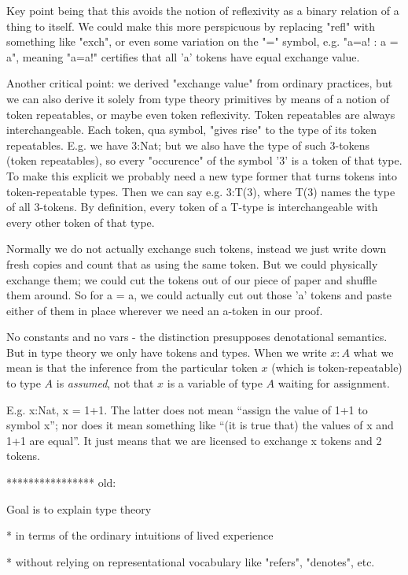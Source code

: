 \documentclass{article}
\begin{document}
Key point being that this avoids the notion of reflexivity as a binary
relation of a thing to itself.  We could make this more perspicuous by
replacing "refl" with something like "exch", or even some variation on
the "=" symbol, e.g.  "a=a! : a = a", meaning "a=a!" certifies that
all 'a' tokens have equal exchange value.

Another critical point: we derived "exchange value" from ordinary
practices, but we can also derive it solely from type theory
primitives by means of a notion of token repeatables, or maybe even
token reflexivity.  Token repeatables are always interchangeable.
Each token, qua symbol, "gives rise" to the type of its token
repeatables.  E.g. we have 3:Nat; but we also have the type of such
3-tokens (token repeatables), so every "occurence" of the symbol '3'
is a token of that type.  To make this explicit we probably need a new
type former that turns tokens into token-repeatable types.  Then we
can say e.g. 3:T(3), where T(3) names the type of all 3-tokens.  By
definition, every token of a T-type is interchangeable with every
other token of that type.

Normally we do not actually exchange such tokens, instead we just
write down fresh copies and count that as using the same token.  But
we could physically exchange them; we could cut the tokens out of our
piece of paper and shuffle them around.  So for a = a, we could
actually cut out those 'a' tokens and paste either of them in place
wherever we need an a-token in our proof.

No constants and no vars - the distinction presupposes denotational
semantics.  But in type theory we only have tokens and types.  When we
write \(x:A\) what we mean is that the inference from the particular
token \(x\) (which is token-repeatable) to type \(A\) is
\emph{assumed}, not that \(x\) is a variable of type \(A\) waiting for
assignment.

E.g. x:Nat, x = 1+1.  The latter does not mean ``assign the value of
1+1 to symbol x''; nor does it mean something like ``(it is true that)
the values of x and 1+1 are equal''.  It just means that we are
licensed to exchange x tokens and 2 tokens.



**************** old:


Goal is to explain type theory

    * in terms of the ordinary intuitions of lived experience

    * without relying on representational vocabulary like "refers", "denotes", etc.
\end{document}
